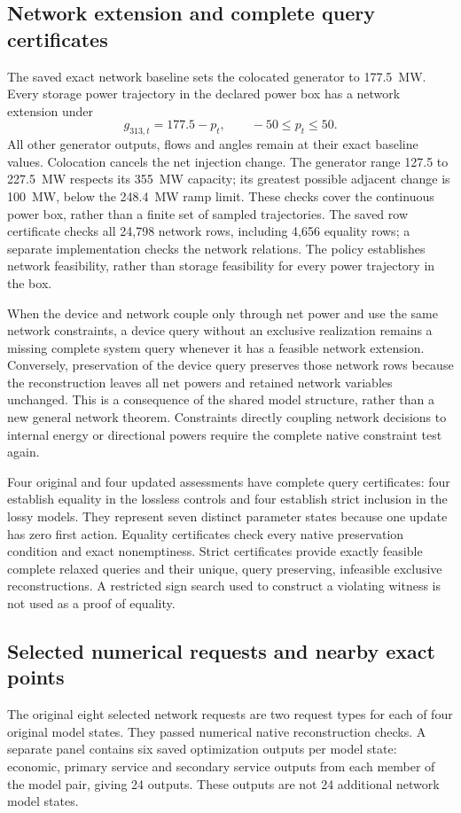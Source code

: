 \subsection{Network extension and complete query certificates}
The saved exact network baseline sets the colocated generator to
177.5~MW. Every storage power trajectory in the declared power box has a
network extension under
\begin{equation}
g_{313,t}=177.5-p_t,\qquad -50\leq p_t\leq50.
\label{eq:sat_network_policy}
\end{equation}
All other generator outputs, flows and angles remain at their exact baseline
values. Colocation cancels the net injection change. The generator range
127.5 to 227.5~MW respects its 355~MW capacity; its greatest possible
adjacent change is 100~MW, below the 248.4~MW ramp limit. These checks cover
the continuous power box, rather than a finite set of sampled trajectories.
The saved row certificate checks all 24,798 network rows, including
4,656 equality rows; a separate implementation checks the network relations.
The policy establishes network feasibility, rather than storage feasibility
for every power trajectory in the box.

When the device and network couple only through net power and use the same
network constraints, a device query without an exclusive realization
remains a missing complete system query whenever it has a feasible network
extension. Conversely, preservation of the device query preserves those
network rows because the reconstruction leaves all net powers and retained
network variables unchanged. This is a consequence of the shared model
structure, rather than a new general network theorem. Constraints directly
coupling network decisions to internal energy or directional powers require
the complete native constraint test again.

Four original and four updated assessments have complete query certificates:
four establish equality in the lossless controls and four establish strict
inclusion in the lossy models. They represent seven distinct parameter
states because one update has zero first action. Equality certificates
check every native preservation condition and exact nonemptiness. Strict
certificates provide exactly feasible complete relaxed queries and their
unique, query preserving, infeasible exclusive reconstructions. A
restricted sign search used to construct a violating witness is not used
as a proof of equality.

\subsection{Selected numerical requests and nearby exact points}
The original eight selected network requests are two request types for each
of four original model states. They passed numerical native reconstruction
checks. A separate panel contains six saved optimization outputs per model
state: economic, primary service and secondary service outputs from each
member of the model pair, giving 24 outputs. These outputs are not 24
additional network model states.

